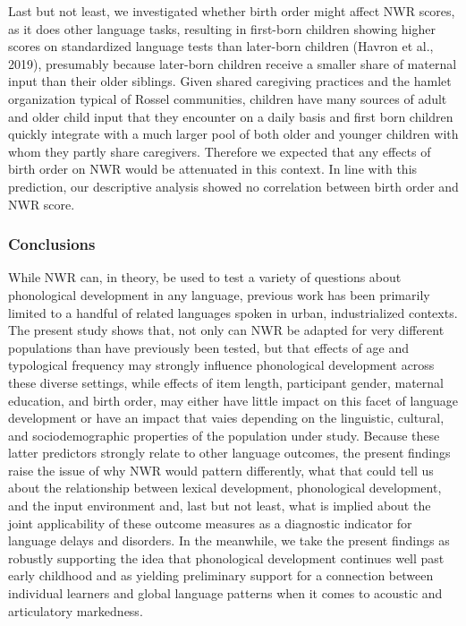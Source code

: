 \documentclass[english,,man,floatsintext]{apa6}
\begin{document}
Last but not least, we investigated whether birth order might affect NWR scores, as it does other language tasks, resulting in first-born children showing higher scores on standardized language tests than later-born children (Havron et al., 2019), presumably because later-born children receive a smaller share of maternal input than their older siblings. Given shared caregiving practices and the hamlet organization typical of Rossel communities, children have many sources of adult and older child input that they encounter on a daily basis and first born children quickly integrate with a much larger pool of both older and younger children with whom they partly share caregivers. Therefore we expected that any effects of birth order on NWR would be attenuated in this context. In line with this prediction, our descriptive analysis showed no correlation between birth order and NWR score.

\hypertarget{conclusions}{%
\subsubsection{Conclusions}\label{conclusions}}

While NWR can, in theory, be used to test a variety of questions about phonological development in any language, previous work has been primarily limited to a handful of related languages spoken in urban, industrialized contexts. The present study shows that, not only can NWR be adapted for very different populations than have previously been tested, but that effects of age and typological frequency may strongly influence phonological development across these diverse settings, while effects of item length, participant gender, maternal education, and birth order, may either have little impact on this facet of language development or have an impact that vaies depending on the linguistic, cultural, and sociodemographic properties of the population under study. Because these latter predictors strongly relate to other language outcomes, the present findings raise the issue of why NWR would pattern differently, what that could tell us about the relationship between lexical development, phonological development, and the input environment and, last but not least, what is implied about the joint applicability of these outcome measures as a diagnostic indicator for language delays and disorders. In the meanwhile, we take the present findings as robustly supporting the idea that phonological development continues well past early childhood and as yielding preliminary support for a connection between individual learners and global language patterns when it comes to acoustic and articulatory markedness.
\end{document}
